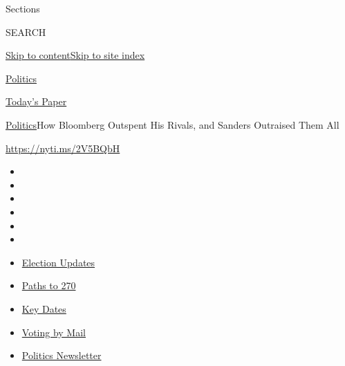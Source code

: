 Sections

SEARCH

\protect\hyperlink{site-content}{Skip to
content}\protect\hyperlink{site-index}{Skip to site index}

\href{https://www.nytimes3xbfgragh.onion/section/politics}{Politics}

\href{https://myaccount.nytimes3xbfgragh.onion/auth/login?response_type=cookie\&client_id=vi}{}

\href{https://www.nytimes3xbfgragh.onion/section/todayspaper}{Today's
Paper}

\href{/section/politics}{Politics}\textbar{}How Bloomberg Outspent His
Rivals, and Sanders Outraised Them All

\url{https://nyti.ms/2V5BQbH}

\begin{itemize}
\item
\item
\item
\item
\item
\item
\end{itemize}

\begin{itemize}
\item
  \href{https://www.nytimes3xbfgragh.onion/live/2020/09/11/us/trump-vs-biden?action=click\&pgtype=Article\&state=default\&region=TOP_BANNER\&context=storylines_menu}{Election
  Updates}
\item
  \href{https://www.nytimes3xbfgragh.onion/interactive/2020/us/elections/election-states-biden-trump.html?action=click\&pgtype=Article\&state=default\&region=TOP_BANNER\&context=storylines_menu}{Paths
  to 270}
\item
  \href{https://www.nytimes3xbfgragh.onion/interactive/2019/us/elections/2020-presidential-election-calendar.html?action=click\&pgtype=Article\&state=default\&region=TOP_BANNER\&context=storylines_menu}{Key
  Dates}
\item
  \href{https://www.nytimes3xbfgragh.onion/interactive/2020/08/31/us/politics/vote-by-mail-deadlines.html?action=click\&pgtype=Article\&state=default\&region=TOP_BANNER\&context=storylines_menu}{Voting
  by Mail}
\item
  \href{https://www.nytimes3xbfgragh.onion/newsletters/politics?action=click\&pgtype=Article\&state=default\&region=TOP_BANNER\&context=storylines_menu}{Politics
  Newsletter}
\end{itemize}

